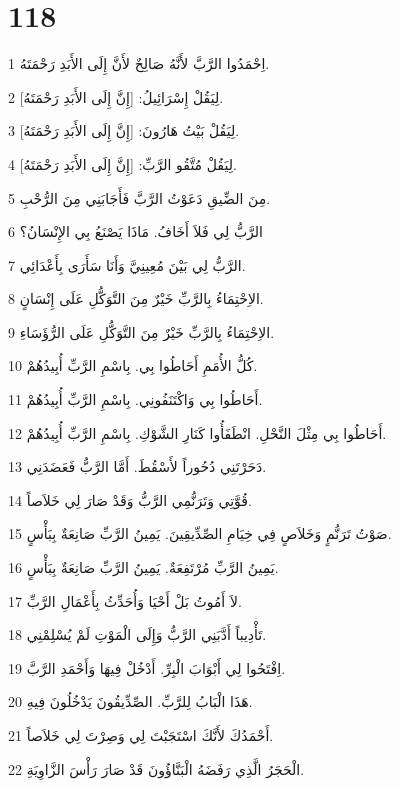 \chapter{118}

\par 1 اِحْمَدُوا الرَّبَّ لأَنَّهُ صَالِحٌ لأَنَّ إِلَى الأَبَدِ رَحْمَتَهُ.
\par 2 لِيَقُلْ إِسْرَائِيلُ: [إِنَّ إِلَى الأَبَدِ رَحْمَتَهُ].
\par 3 لِيَقُلْ بَيْتُ هَارُونَ: [إِنَّ إِلَى الأَبَدِ رَحْمَتَهُ].
\par 4 لِيَقُلْ مُتَّقُو الرَّبِّ: [إِنَّ إِلَى الأَبَدِ رَحْمَتَهُ].
\par 5 مِنَ الضِّيقِ دَعَوْتُ الرَّبَّ فَأَجَابَنِي مِنَ الرُّحْبِ.
\par 6 الرَّبُّ لِي فَلاَ أَخَافُ. مَاذَا يَصْنَعُ بِي الإِنْسَانُ؟
\par 7 الرَّبُّ لِي بَيْنَ مُعِينِيَّ وَأَنَا سَأَرَى بِأَعْدَائِي.
\par 8 الاِحْتِمَاءُ بِالرَّبِّ خَيْرٌ مِنَ التَّوَكُّلِ عَلَى إِنْسَانٍ.
\par 9 الاِحْتِمَاءُ بِالرَّبِّ خَيْرٌ مِنَ التَّوَكُّلِ عَلَى الرُّؤَسَاءِ.
\par 10 كُلُّ الأُمَمِ أَحَاطُوا بِي. بِاسْمِ الرَّبِّ أُبِيدُهُمْ.
\par 11 أَحَاطُوا بِي وَاكْتَنَفُونِي. بِاسْمِ الرَّبِّ أُبِيدُهُمْ.
\par 12 أَحَاطُوا بِي مِثْلَ النَّحْلِ. انْطَفَأُوا كَنَارِ الشَّوْكِ. بِاسْمِ الرَّبِّ أُبِيدُهُمْ.
\par 13 دَحَرْتَنِي دُحُوراً لأَسْقُطَ. أَمَّا الرَّبُّ فَعَضَدَنِي.
\par 14 قُوَّتِي وَتَرَنُّمِي الرَّبُّ وَقَدْ صَارَ لِي خَلاَصاً.
\par 15 صَوْتُ تَرَنُّمٍ وَخَلاَصٍ فِي خِيَامِ الصِّدِّيقِينَ. يَمِينُ الرَّبِّ صَانِعَةٌ بِبَأْسٍ.
\par 16 يَمِينُ الرَّبِّ مُرْتَفِعَةٌ. يَمِينُ الرَّبِّ صَانِعَةٌ بِبَأْسٍ.
\par 17 لاَ أَمُوتُ بَلْ أَحْيَا وَأُحَدِّثُ بِأَعْمَالِ الرَّبِّ.
\par 18 تَأْدِيباً أَدَّبَنِي الرَّبُّ وَإِلَى الْمَوْتِ لَمْ يُسْلِمْنِي.
\par 19 اِفْتَحُوا لِي أَبْوَابَ الْبِرِّ. أَدْخُلْ فِيهَا وَأَحْمَدِ الرَّبَّ.
\par 20 هَذَا الْبَابُ لِلرَّبِّ. الصِّدِّيقُونَ يَدْخُلُونَ فِيهِ.
\par 21 أَحْمَدُكَ لأَنَّكَ اسْتَجَبْتَ لِي وَصِرْتَ لِي خَلاَصاً.
\par 22 الْحَجَرُ الَّذِي رَفَضَهُ الْبَنَّاؤُونَ قَدْ صَارَ رَأْسَ الزَّاوِيَةِ.
